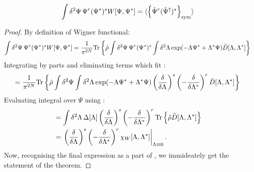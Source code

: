 \begin{theorem}
\label{thm:formalism:func-wigner:moments}
\[
	\int \delta^2\Psi\, \Psi^r (\Psi^*)^s W[\Psi, \Psi^*]
	= \langle \left\{  \hat{\Psi}^r (\hat{\Psi}^\dagger)^s  \right\}_{\mathrm{sym}} \rangle
\]
\end{theorem}
\begin{proof}
By definition of Wigner functional:
\begin{equation*}
\begin{split}
	\int \delta^2\Psi\, \Psi^r (\Psi^*)^s W[\Psi, \Psi^*]
	= \frac{1}{\pi^{2N}} \mathrm{Tr} \left\{  \hat{\rho}
		\int \delta^2\Psi\, \Psi^r (\Psi^*)^s
		\int \delta^2\Lambda \exp(-\Lambda \Psi^* + \Lambda^* \Psi)
		\hat{D}[\Lambda, \Lambda^*]
	 \right\}
\end{split}
\end{equation*}
Integrating by parts and eliminating terms which fit :
\[
	= \frac{1}{\pi^{2N}} \mathrm{Tr} \left\{  \hat{\rho}
		\int \delta^2\Psi \int \delta^2\Lambda
		\exp(-\Lambda \Psi^* + \Lambda^* \Psi)
		\left( \frac{\delta}{\delta \Lambda} \right)^s
		\left( -\frac{\delta}{\delta \Lambda^*} \right)^r
		\hat{D}[\Lambda, \Lambda^*]
	 \right\}
\]
Evaluating integral over $\Psi$ using :
\begin{equation*}
\begin{split}
	& = \int \delta^2\Lambda\,
		\Delta[\Lambda]
		\left( \frac{\delta}{\delta \Lambda} \right)^s
		\left( -\frac{\delta}{\delta \Lambda^*} \right)^r
		\mathrm{Tr} \left\{ 
			\hat{\rho}
			\hat{D}[\Lambda, \Lambda^*]
		 \right\} \\
	& = \left.
		\left( \frac{\delta}{\delta \Lambda} \right)^s
		\left( -\frac{\delta}{\delta \Lambda^*} \right)^r
		\chi_W [\Lambda, \Lambda^*]
	\right|_{\Lambda \equiv 0}.
\end{split}
\end{equation*}
Now, recognising the final expression as a part of ,
we immideately get the statement of the theorem.
\end{proof}

